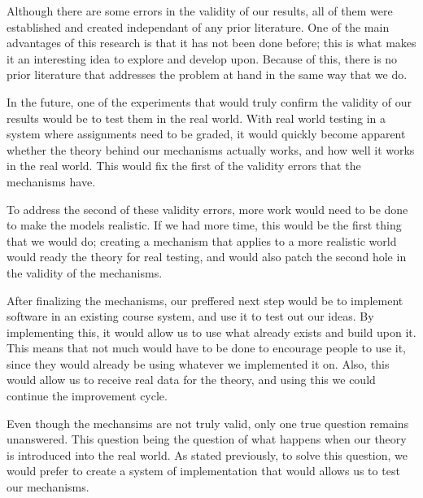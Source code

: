 \documentclass[12pt, Arial]{article}
\begin{document}
Although there are some errors in the validity of our results, all of them were established and created independant of any prior literature. One of the main advantages of this research is that it has not been done before; this is what makes it an interesting idea to explore and develop upon. Because of this, there is no prior literature that addresses the problem at hand in the same way that we do.

In the future, one of the experiments that would truly confirm the validity of our results would be to test them in the real world. With real world testing in a system where assignments need to be graded, it would quickly become apparent whether the theory behind our mechanisms actually works, and how well it works in the real world. This would fix the first of the validity errors that the mechanisms have.

To address the second of these validity errors, more work would need to be done to make the models realistic. If we had more time, this would be the first thing that we would do; creating a mechanism that applies to a more realistic world would ready the theory for real testing, and would also patch the second hole in the validity of the mechanisms.

After finalizing the mechanisms, our preffered next step would be to implement software in an existing course system, and use it to test out our ideas. By implementing this, it would allow us to use what already exists and build upon it. This means that not much would have to be done to encourage people to use it, since they would already be using whatever we implemented it on. Also, this would allow us to receive real data for the theory, and using this we could continue the improvement cycle.

Even though the mechansims are not truly valid, only one true question remains unanswered. This question being the question of what happens when our theory is introduced into the real world. As stated previously, to solve this question, we would prefer to create a system of implementation that would allows us to test our mechanisms.
{}

\end{document}
